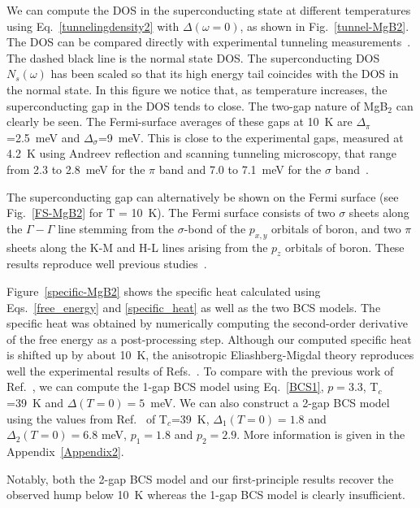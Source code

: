 \documentclass[final,3p,times,twocolumn]{elsarticle}
\newcounter{bla}
\begin{document}
We can compute the DOS in the superconducting state at different temperatures using Eq.~\eqref{tunnelingdensity2} with $\Delta(\omega=0)$,  as shown in Fig.~\ref{tunnel-MgB2}. The DOS can be compared directly with experimental tunneling measurements~\cite{Giubileo2001}. 
The dashed black line is the normal state DOS. The superconducting DOS $N_s(\omega)$ has been scaled so that its high energy tail coincides with the DOS in the normal state.
In this figure we notice that, as temperature increases, the superconducting gap in the DOS tends to close.
The two-gap nature of MgB$_2$ can clearly be seen. The Fermi-surface averages of these gaps at 10~K are $\Delta_\pi$=2.5~meV and $\Delta_\sigma$=9~meV. 
This is close to the experimental gaps, measured at 4.2~K using Andreev reflection and scanning tunneling microscopy, that range from 2.3 to 2.8~meV for the $\pi$ band and 7.0 to 7.1~meV for the $\sigma$ band~\cite{Szabo2001,Iavarone2002,Gonnelli2002}.


The superconducting gap can alternatively be shown on the Fermi surface (see Fig.~\ref{FS-MgB2} for T = 10~K).
The Fermi surface consists of two $\sigma$ sheets along the $\Gamma-\Gamma$ line stemming from the $\sigma$-bond of the $p_{x,y}$ orbitals of boron, and two $\pi$ sheets along the K-M and H-L lines arising from the $p_z$ orbitals of boron. These results reproduce well previous studies~\cite{Choi2002,Choi2003}. 


Figure~\ref{specific-MgB2} shows the specific heat calculated using Eqs.~\eqref{free_energy} and \eqref{specific_heat} as well as the two BCS models. The specific heat was obtained by numerically computing the second-order derivative of the free energy as a post-processing step. Although our computed specific heat is shifted up by about 10~K, the anisotropic Eliashberg-Migdal theory reproduces well the experimental results of Refs.~\cite{Wang2001,Bouquet2001}. 
To compare with the previous work of Ref.~\cite{Choi2003}, 
we can compute the 1-gap BCS model using Eq.~\eqref{BCS1},
 $p=3.3$, T$_c$=39~K and $\Delta(T=0)=5$~meV. 
We can also construct a 2-gap BCS model using the values from Ref.~\cite{Choi2003} of T$_c$=39~K, $\Delta_1(T=0)=1.8$ and $\Delta_2(T=0)=6.8$ meV, $p_1=1.8$ and $p_2=2.9$. More information is given in the Appendix~\ref{Appendix2}.

Notably, both the 2-gap BCS model and our first-principle results recover the observed hump below 10~K whereas the 1-gap BCS model is clearly insufficient. 
\end{document}
